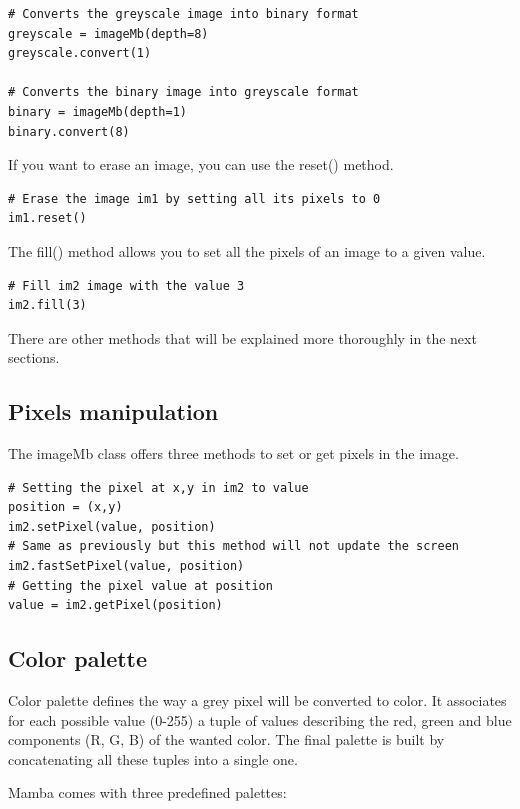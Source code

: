 \documentclass[a4paper,10pt,oneside]{article}
\begin{document}
\lstset{language=Python}
\begin{lstlisting}
# Converts the greyscale image into binary format
greyscale = imageMb(depth=8)
greyscale.convert(1)

# Converts the binary image into greyscale format
binary = imageMb(depth=1)
binary.convert(8)
\end{lstlisting}

If you want to erase an image, you can use the reset() method. 

\lstset{language=Python}
\begin{lstlisting}
# Erase the image im1 by setting all its pixels to 0
im1.reset()
\end{lstlisting}

The fill() method allows you to set all the pixels of an image to a given value.

\lstset{language=Python}
\begin{lstlisting}
# Fill im2 image with the value 3
im2.fill(3)
\end{lstlisting}

There are other methods that will be explained more thoroughly in the next sections.

\subsection{Pixels manipulation}

The imageMb class offers three methods to set or get pixels in the image.

\lstset{language=Python}
\begin{lstlisting}
# Setting the pixel at x,y in im2 to value
position = (x,y)
im2.setPixel(value, position)
# Same as previously but this method will not update the screen
im2.fastSetPixel(value, position)
# Getting the pixel value at position
value = im2.getPixel(position)
\end{lstlisting}

\subsection{Color palette}

Color palette defines the way a grey pixel will be converted to color. It 
associates for each possible value (0-255) a tuple of values describing the red, 
green and blue components (R, G, B) of the wanted color. The final palette is 
built by concatenating all these tuples into a single one.

Mamba comes with three predefined palettes:
\end{document}
